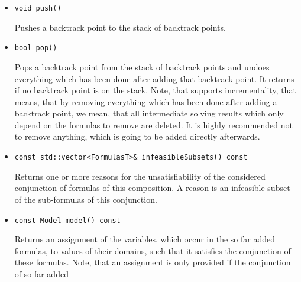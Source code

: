 \begin{itemize}
	SMT solver, these lemmas can be used in its sat solving process in the same way as infeasible subsets are 
	used. The strategy of an SMT solver composed with \smtrat has to involve a \satModule before any theory module
	is used\footnote{It is possible to define a strategy using conditions in a way, that we achieve an SMT solver, even if for some cases no \satModule is involved before a theory module is applied.} and, therefore, the SMT solver never communicates these lemmas as they are already processed by the
	\satModule. A better explanation on the modules and the strategy can be found in Chapter~\ref{chapter:generalframework} 
	and Chapter~\ref{chapter:composingats}. If the Boolean argument of the function \texttt{check} is \false, the composed solver is allowed to omit hard obstacles during solving at the cost of returning \UNKNOWN in more cases.
     \item \begin{verbatim}void push()\end{verbatim}
    	Pushes a backtrack point to the stack of backtrack points.
    \item \begin{verbatim}bool pop()\end{verbatim}
    	Pops a backtrack point from the stack of backtrack points and undoes everything
		which has been done after adding that backtrack point. It returns \false if no backtrack
		point is on the stack. Note, that \smtrat supports incrementality, that means, that by removing
		everything which has been done after adding a backtrack point, we mean, that all 
		intermediate solving results which only depend on the formulas to remove are deleted. It is highly
		recommended not to remove anything, which is going to be added directly afterwards.
    \item \begin{verbatim}const std::vector<FormulasT>& infeasibleSubsets() const\end{verbatim}
    	Returns one or more reasons for the unsatisfiability of the considered conjunction of 
    	formulas of this \smtrat composition. A reason
    	is an infeasible subset of the sub-formulas of this conjunction.
    \item \begin{verbatim}const Model model() const\end{verbatim}
    	Returns an assignment of the variables, which occur in the so far added
        formulas, to values of their domains, such that it satisfies the 
        conjunction of these formulas. Note, that an assignment is only provided if the conjunction of so far added

\end{itemize}
